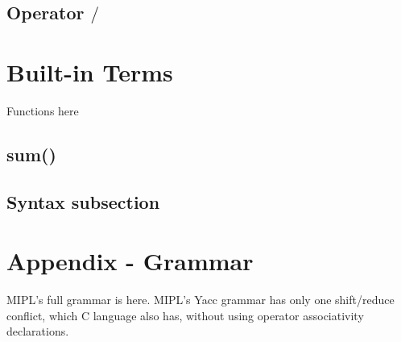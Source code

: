 \documentclass[prodmode,acmtecs]{acmsmall}
\begin{document}
\subsection{Operator $/$}

\section{Built-in Terms}
Functions here

\subsection{sum()}

\subsection{Syntax subsection}

\section*{Appendix - Grammar}

MIPL's full grammar is here. MIPL's Yacc grammar has only one shift/reduce conflict, which C language also has, without using operator associativity declarations.


%
%




%
%



\medskip

\end{document}
